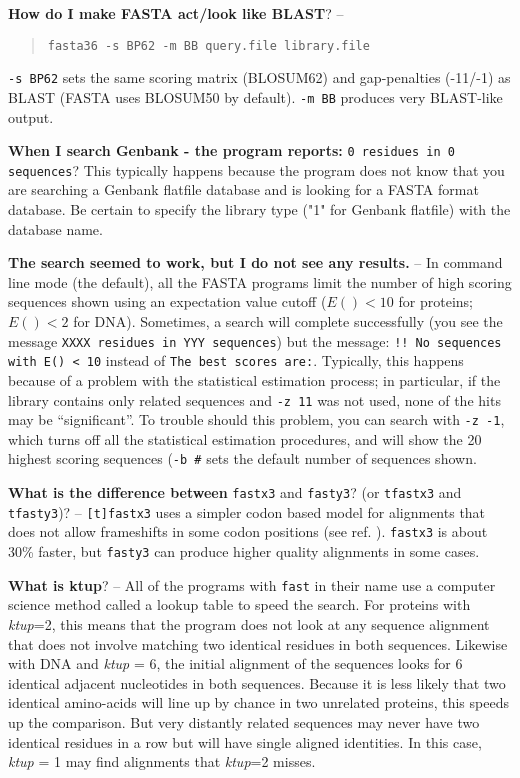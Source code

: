 \documentclass[11pt]{article}
\begin{document}
{\noindent}\textbf{How do I make FASTA act/look like BLAST}? --
\vspace{-0.5ex}
\begin{quote}
\texttt{fasta36 -s BP62 -m BB query.file library.file}
\end{quote}
\vspace{-0.5ex}
\texttt{-s BP62} sets the same scoring matrix (BLOSUM62) and
gap-penalties (-11/-1) as BLAST (FASTA uses BLOSUM50 by
default). \texttt{-m BB} produces very BLAST-like output.

{\noindent}\textbf{When I search Genbank - the program reports:} \texttt{0 residues in 0
sequences}?  This typically happens because the program does not
know that you are searching a Genbank flatfile database and is looking
for a FASTA format database.  Be certain to specify the library type
("1" for Genbank flatfile) with the database name.

{\noindent}\textbf{The search seemed to work, but I do not see any results.} -- In
command line mode (the default), all the FASTA programs limit the
number of high scoring sequences shown using an expectation value
cutoff ($E()<10$ for proteins; $E()<2$ for DNA).  Sometimes, a search
will complete successfully (you see the message \texttt{XXXX residues
  in YYY sequences}) but the message: \texttt{!! No sequences with E()
  < 10} instead of \texttt{The best scores are:}.  Typically, this
happens because of a problem with the statistical estimation process;
in particular, if the library contains only related sequences and
\texttt{-z 11} was not used, none of the hits may be ``significant''.
To trouble should this problem, you can search with \texttt{-z -1},
which turns off all the statistical estimation procedures, and will
show the 20 highest scoring sequences (\texttt{-b \#} sets the default
number of sequences shown.

{\noindent}\textbf{What is the difference between} \texttt{fastx3} and
\texttt{fasty3}? (or \texttt{tfastx3} and \texttt{tfasty3})? --
\texttt{[t]fastx3} uses a simpler codon based model for alignments
that does not allow frameshifts in some codon positions (see
ref. \cite{wrp971}).  \texttt{fastx3} is about 30\% faster, but
\texttt{fasty3} can produce higher quality alignments in some cases.

\vspace{0.5ex}
{\noindent}\textbf{What is ktup}? -- All of the programs with \texttt{fast} in their
name use a computer science method called a lookup table to speed the
search.  For proteins with \emph{ktup}=2, this means that the program
does not look at any sequence alignment that does not involve matching
two identical residues in both sequences.  Likewise with DNA and
\emph{ktup} = 6, the initial alignment of the sequences looks for 6
identical adjacent nucleotides in both sequences.  Because it is less
likely that two identical amino-acids will line up by chance in two
unrelated proteins, this speeds up the comparison.  But very distantly
related sequences may never have two identical residues in a row but
will have single aligned identities.  In this case, \emph{ktup} = 1 may
find alignments that \emph{ktup}=2 misses.
\end{document}
